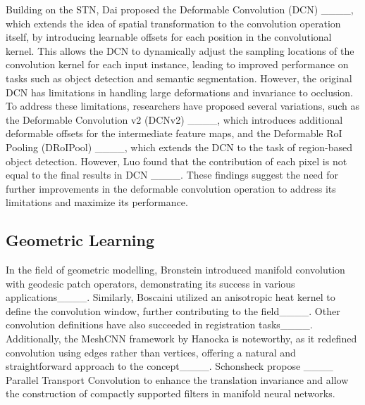 Building on the STN, Dai \etal proposed the Deformable Convolution (DCN) ____, which extends the idea of spatial transformation to the convolution operation itself, by introducing learnable offsets for each position in the convolutional kernel. This allows the DCN to dynamically adjust the sampling locations of the convolution kernel for each input instance, leading to improved performance on tasks such as object detection and semantic segmentation. However, the original DCN has limitations in handling large deformations and invariance to occlusion. To address these limitations, researchers have proposed several variations, such as the Deformable Convolution v2 (DCNv2) ____, which introduces additional deformable offsets for the intermediate feature maps, and the Deformable RoI Pooling (DRoIPool) ____, which extends the DCN to the task of region-based object detection. However, Luo \etal found that the contribution of each pixel is not equal to the final results in DCN ____. These findings suggest the need for further improvements in the deformable convolution operation to address its limitations and maximize its performance.

\subsection{Geometric Learning}
In the field of geometric modelling, Bronstein \etal introduced manifold convolution with geodesic patch operators, demonstrating its success in various applications____. Similarly, Boscaini \etal utilized an anisotropic heat kernel to define the convolution window, further contributing to the field____. Other convolution definitions have also succeeded in registration tasks____. Additionally, the MeshCNN framework by Hanocka \etal is noteworthy, as it redefined convolution using edges rather than vertices, offering a natural and straightforward approach to the concept____. Schonsheck \etal propose ____ Parallel Transport Convolution to enhance the translation invariance and allow the construction of compactly supported filters in manifold neural networks.